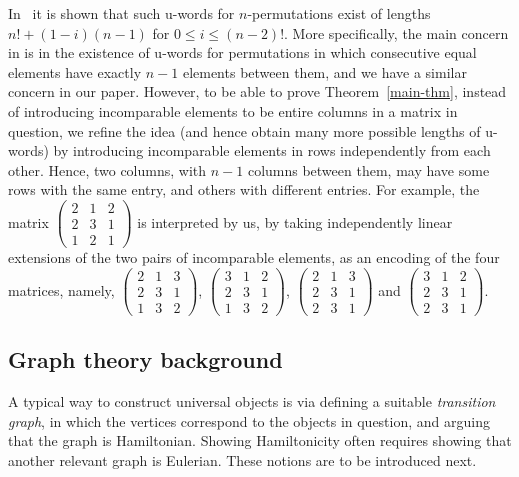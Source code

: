 \documentclass[12pt]{article}
\begin{document}
In~\cite{KPV} it is shown that such u-words for $n$-permutations exist of lengths $n!+(1-i)(n-1)$ for $0\leq i\leq (n-2)!$. More specifically, the main concern in \cite{KPV}  is in the existence of u-words for permutations in which consecutive equal elements have exactly $n-1$ elements between them, and we have a similar concern in our paper.  However, to be able to prove Theorem~\ref{main-thm}, instead of introducing incomparable elements to be entire columns in a matrix in question, we refine the idea (and hence obtain many more possible lengths of u-words) by introducing incomparable elements in rows independently from each other. Hence, two columns, with $n-1$ columns between them, may have some rows with the same entry, and others with different entries.   For example, the matrix   {\footnotesize $\left(\begin{array}{ccc} 2 & 1 & 2 \\ 2 & 3 & 1 \\ 1 & 2 & 1 \end{array}\right)$} is interpreted by us, by taking independently linear extensions of the two pairs of incomparable elements, as an encoding of the four matrices, namely,  {\footnotesize $\left(\begin{array}{ccc} 2 & 1 & 3 \\ 2 & 3 & 1 \\ 1 & 3 & 2 \end{array}\right)$},  {\footnotesize $\left(\begin{array}{ccc} 3 & 1 & 2 \\ 2 & 3 & 1 \\ 1 & 3 & 2 \end{array}\right)$},  {\footnotesize $\left(\begin{array}{ccc} 2 & 1 & 3 \\ 2 & 3 & 1 \\ 2 & 3 & 1 \end{array}\right)$} and  {\footnotesize $\left(\begin{array}{ccc} 3 & 1 & 2 \\ 2 & 3 & 1 \\ 2 & 3 & 1 \end{array}\right)$}.

\subsection{Graph theory background}

A typical way to construct universal objects is via defining a suitable {\em transition graph}, in which the vertices correspond to the objects in question, and arguing that the graph is Hamiltonian. Showing Hamiltonicity often requires showing that another relevant graph is Eulerian. These notions are to be introduced next.
\end{document}
